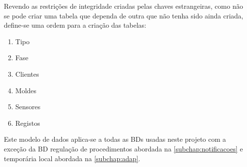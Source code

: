 \documentclass[11pt,twoside,a4paper]{report}
\begin{document}
\newpage
Revendo as restrições de integridade criadas pelas chaves estrangeiras, como não se pode criar uma tabela que dependa de outra que não tenha sido ainda criada, define-se uma ordem para a criação das tabelas:
\begin{enumerate}[noitemsep]
	\item Tipo
	\item Fase
	\item Clientes
	\item Moldes
	\item Sensores
	\item Registos
\end{enumerate}
Este modelo de dados aplica-se a todas as BDs usadas neste projeto com a exceção da BD regulação de procedimentos abordada na \autoref{subchap:notificacoes} e temporária local abordada na \autoref{subchap:adap}.
\end{document}
